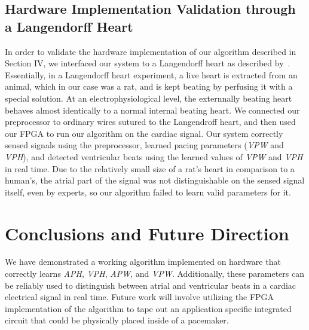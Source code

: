 \documentclass[conference]{IEEEtran}
\newcommand{\APW}{\textit{APW}}
\newcommand{\VPW}{\textit{VPW}}
\newcommand{\APH}{\textit{APH}}
\newcommand{\VPH}{\textit{VPH}}
\begin{document}
\subsection{Hardware Implementation Validation through a Langendorff Heart}
In order to validate the hardware implementation of
our algorithm described in Section IV, we interfaced our %
system to a Langendorff heart as described by~\cite{langendorff}.
Essentially, in a Langendorff heart experiment, a live
heart is extracted from an animal, which in our case was
a rat, and is kept beating by perfusing it with a special solution. %
At an electrophysiological level, the externnally beating heart behaves almost identically to a normal internal beating heart.
We connected our preprocessor to ordinary wires
sutured to the Langendroff heart, and then used our
FPGA to run our algorithm on the cardiac signal.
Our system correctly sensed signals using
the preprocessor, learned pacing parameters (\VPW{} and
\VPH{}), and detected ventricular beats using the learned
values of \VPW{} and \VPH{} in real time. Due to the
relatively small size of a rat's heart in comparison to a
human's, the atrial part of the signal was not
distinguishable on the sensed signal itself, even by experts,
so our algorithm failed to learn valid parameters for it.

\section{Conclusions and Future Direction}
We have demonstrated a working algorithm
implemented on hardware that correctly learns \APH{},
\VPH{}, \APW{}, and \VPW{}. Additionally, these parameters
can be reliably used to distinguish between atrial and
ventricular beats in a cardiac electrical signal in real time. Future
work will involve utilizing the FPGA implementation of
the algorithm to tape out an application specific
integrated circuit that could be physically placed inside
of a pacemaker.

%
%
\end{document}

